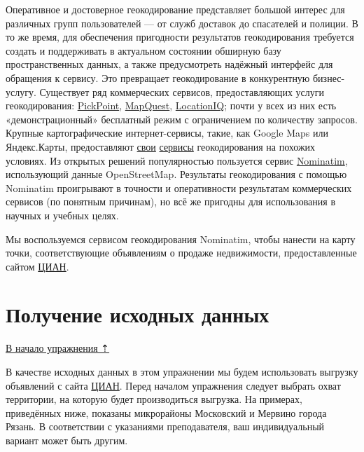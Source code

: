\documentclass[
  12pt,
]{book}
\begin{document}
Оперативное и достоверное геокодирование представляет большой интерес для различных групп пользователей --- от служб доставок до спасателей и полиции. В то же время, для обеспечения пригодности результатов геокодирования требуется создать и поддерживать в актуальном состоянии обширную базу пространственных данных, а также предусмотреть надёжный интерфейс для обращения к сервису. Это превращает геокодирование в конкурентную бизнес-услугу. Существует ряд коммерческих сервисов, предоставляющих услуги геокодирования: \href{https://pickpoint.io/ru}{PickPoint}, \href{https://developer.mapquest.com/documentation/geocoding-api/}{MapQuest}, \href{https://locationiq.com/geocoding}{LocationIQ}; почти у всех из них есть «демонстрационный» бесплатный режим с ограничением по количеству запросов. Крупные картографические интернет-сервисы, такие, как Google Maps или Яндекс.Карты, предоставляют \href{https://developers.google.com/maps/documentation/javascript/geocoding}{свои} \href{https://yandex.ru/dev/maps/geocoder/doc/desc/concepts/about.html}{сервисы} геокодирования на похожих условиях. Из открытых решений популярностью пользуется сервис \href{https://nominatim.org/}{Nominatim}, использующий данные OpenStreetMap. Результаты геокодирования с помощью Nominatim проигрывают в точности и оперативности результатам коммерческих сервисов (по понятным причинам), но всё же пригодны для использования в научных и учебных целях.

Мы воспользуемся сервисом геокодирования Nominatim, чтобы нанести на карту точки, соответствующие объявлениям о продаже недвижимости, предоставленные сайтом \href{https://www.cian.ru/}{ЦИАН}.

\hypertarget{geocoding-input}{%
\section{Получение исходных данных}\label{geocoding-input}}

\protect\hyperlink{geocoding}{В начало упражнения ⇡}

В качестве исходных данных в этом упражнении мы будем использовать выгрузку объявлений с сайта \href{https://www.cian.ru/}{ЦИАН}. Перед началом упражнения следует выбрать охват территории, на которую будет производиться выгрузка. На примерах, приведённых ниже, показаны микрорайоны Московский и Мервино города Рязань. В соответствии с указаниями преподавателя, ваш индивидуальный вариант может быть другим.
\end{document}
